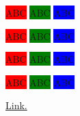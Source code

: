 \documentclass[a4paper,11pt]{article}
\begin{document}
\colorbox{red}{ABC}
\colorbox{green}{ABC}
\colorbox{blue}{ABC}

\vspace{1em}


\colorbox{red}{ABC}
\colorbox{green}{ABC}
\colorbox{blue}{ABC}

\begingroup



\colorbox{red}{ABC}
\colorbox{green}{ABC}
\colorbox{blue}{ABC}

\endgroup

\colorbox{red}{ABC}
\colorbox{green}{ABC}
\colorbox{blue}{ABC}

\vspace{1em}


\href{https://www.crisismagazine.com/2021/the-theological-illiteracy-of-dare-we-hope}{Link.}




\end{document}
